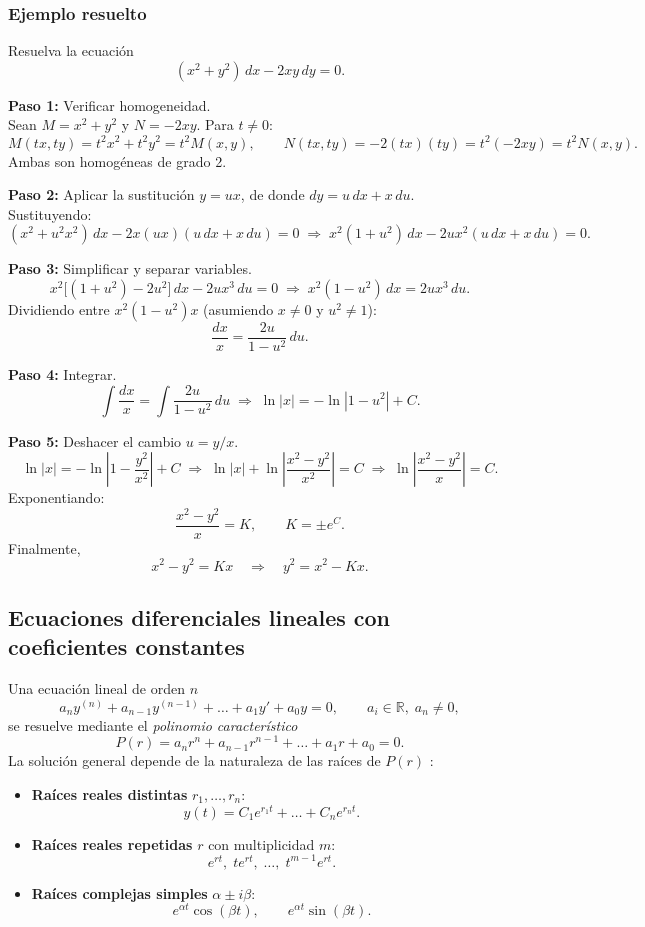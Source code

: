 \documentclass[stu,12pt,donotrepeattitle]{apa7}
\begin{document}
\subsubsection*{Ejemplo resuelto}
Resuelva la ecuación
\[
(x^2+y^2)\,dx-2xy\,dy=0.
\]

\textbf{Paso 1:} Verificar homogeneidad.\\
Sean \(M=x^2+y^2\) y \(N=-2xy\). Para \(t\neq 0\):
\[
M(tx,ty)=t^2x^2+t^2y^2=t^2M(x,y),\qquad
N(tx,ty)=-2(tx)(ty)=t^2(-2xy)=t^2N(x,y).
\]
Ambas son homogéneas de grado 2.

\textbf{Paso 2:} Aplicar la sustitución \(y=ux\), de donde \(dy=u\,dx+x\,du\).\\
Sustituyendo:
\[
(x^2+u^2x^2)\,dx-2x(ux)(u\,dx+x\,du)=0
\;\Longrightarrow\;
x^2(1+u^2)\,dx-2u x^2(u\,dx+x\,du)=0.
\]

\textbf{Paso 3:} Simplificar y separar variables.
\[
x^2\bigl[(1+u^2)-2u^2\bigr]\,dx-2u x^3\,du=0
\;\Longrightarrow\;
x^2(1-u^2)\,dx=2u x^3\,du.
\]
Dividiendo entre \(x^2(1-u^2)x\) (asumiendo \(x\neq 0\) y \(u^2\neq 1\)):
\[
\frac{dx}{x}=\frac{2u}{1-u^2}\,du.
\]

\textbf{Paso 4:} Integrar.
\[
\int\frac{dx}{x}=\int\frac{2u}{1-u^2}\,du
\;\Longrightarrow\;
\ln|x|=-\ln|1-u^2|+C.
\]

\textbf{Paso 5:} Deshacer el cambio \(u=y/x\).
\[
\ln|x|=-\ln\left|1-\frac{y^2}{x^2}\right|+C
\;\Longrightarrow\;
\ln|x|+\ln\left|\frac{x^2-y^2}{x^2}\right|=C
\;\Longrightarrow\;
\ln\left|\frac{x^2-y^2}{x}\right|=C.
\]
Exponentiando:
\[
\frac{x^2-y^2}{x}=K,\qquad K=\pm e^C.
\]
Finalmente,
\[
x^2-y^2=Kx\quad\Longrightarrow\quad y^2=x^2-Kx.
\]

\subsection{Ecuaciones diferenciales lineales con coeficientes constantes}
Una ecuación lineal de orden \(n\)
\begin{equation}\label{eq:lincc}
a_n y^{(n)}+a_{n-1}y^{(n-1)}+\dots+a_1y'+a_0y=0,\qquad a_i\in\mathbb{R},\;a_n\neq 0,
\end{equation}
se resuelve mediante el \emph{polinomio característico}
\[
P(r)=a_nr^n+a_{n-1}r^{n-1}+\dots+a_1r+a_0=0.
\]
La solución general depende de la naturaleza de las raíces de \(P(r)\) \cite{Boyce2012}:

\begin{itemize}[leftmargin=*,nosep]
\item \textbf{Raíces reales distintas} \(r_1,\dots,r_n\):
\[
y(t)=C_1e^{r_1t}+\dots+C_ne^{r_nt}.
\]

\item \textbf{Raíces reales repetidas} \(r\) con multiplicidad \(m\):
\[
e^{rt},\;te^{rt},\;\dots,\;t^{m-1}e^{rt}.
\]

\item \textbf{Raíces complejas simples} \(\alpha\pm i\beta\):
\[
e^{\alpha t}\cos(\beta t),\qquad e^{\alpha t}\sin(\beta t).
\]
\end{itemize}
\end{document}
